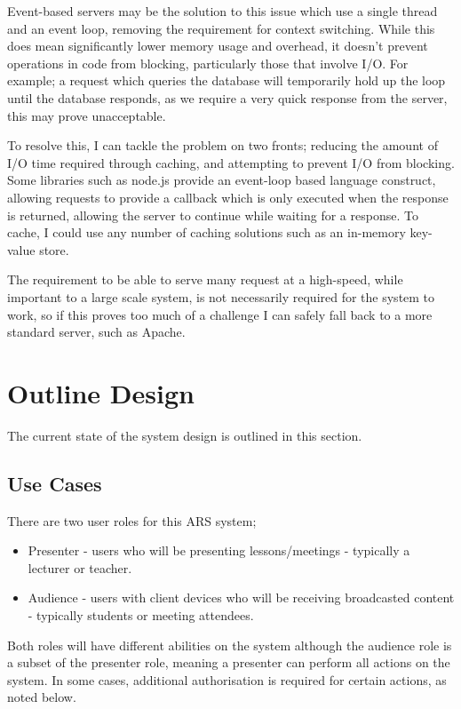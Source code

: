 \documentclass[a4papert,11pt,notitlepage]{ltxdoc}
\begin{document}
Event-based servers may be the solution to this issue which use a single thread and an event loop, removing the requirement for context switching. While this does mean significantly lower memory usage and overhead, it doesn't prevent operations in code from blocking, particularly those that involve I/O. For example; a request which queries the database will temporarily hold up the loop until the database responds, as we require a very quick response from the server, this may prove unacceptable.

To resolve this, I can tackle the problem on two fronts; reducing the amount of I/O time required through caching, and attempting to prevent I/O from blocking. Some libraries such as node.js provide an event-loop based language construct, allowing requests to provide a callback which is only executed when the response is returned, allowing the server to continue while waiting for a response. To cache, I could use any number of caching solutions such as an in-memory key-value store.

The requirement to be able to serve many request at a high-speed, while important to a large scale system, is not necessarily required for the system to work, so if this proves too much of a challenge I can safely fall back to a more standard server, such as Apache.

\section{Outline Design}
The current state of the system design is outlined in this section.

\subsection{Use Cases}
There are two user roles for this ARS system;
\begin{itemize}
\item Presenter - users who will be presenting lessons/meetings - typically a lecturer or teacher.
\item Audience - users with client devices who will be receiving broadcasted content - typically students or meeting attendees.
\end{itemize}

Both roles will have different abilities on the system although the audience role is a subset of the presenter role, meaning a presenter can perform all actions on the system. In some cases, additional authorisation is required for certain actions, as noted below.
\end{document}
